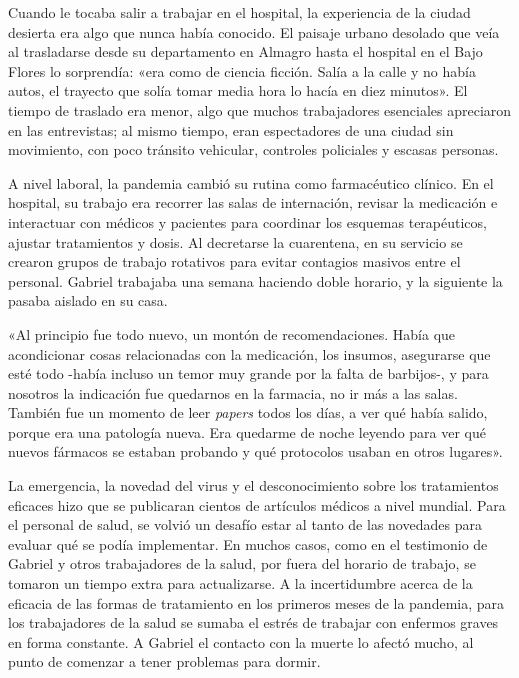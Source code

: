 \begin{refsection}
Cuando le tocaba salir a trabajar en el hospital, la experiencia de la ciudad desierta era algo que nunca había conocido. El paisaje urbano desolado que veía al trasladarse desde su departamento en Almagro hasta el hospital en el Bajo Flores lo sorprendía: «era como de ciencia ficción. Salía a la calle y no había autos, el trayecto que solía tomar media hora lo hacía en diez minutos». El tiempo de traslado era menor, algo que muchos trabajadores esenciales apreciaron en las entrevistas; al mismo tiempo, eran espectadores de una ciudad sin movimiento, con poco tránsito vehicular, controles policiales y escasas personas.

A nivel laboral, la pandemia cambió su rutina como farmacéutico clínico. En el hospital, su trabajo era recorrer las salas de internación, revisar la medicación e interactuar con médicos y pacientes para coordinar los esquemas terapéuticos, ajustar tratamientos y dosis. Al decretarse la cuarentena, en su servicio se crearon grupos de trabajo rotativos para evitar contagios masivos entre el personal. Gabriel trabajaba una semana haciendo doble horario, y la siguiente la pasaba aislado en su casa.


\begin{gbcita}
«Al principio fue todo nuevo, un montón de recomendaciones. Había que acondicionar cosas relacionadas con la medicación, los insumos, asegurarse que esté todo -había incluso un temor muy grande por la falta de barbijos-, y para nosotros la indicación fue quedarnos en la farmacia, no ir más a las salas. También fue un momento de leer \emph{papers} todos los días, a ver qué había salido, porque era una patología nueva. Era quedarme de noche leyendo para ver qué nuevos fármacos se estaban probando y qué protocolos usaban en otros lugares».

\end{gbcita}

La emergencia, la novedad del virus y el desconocimiento sobre los tratamientos eficaces hizo que se publicaran cientos de artículos médicos a nivel mundial. Para el personal de salud, se volvió un desafío estar al tanto de las novedades para evaluar qué se podía implementar. En muchos casos, como en el testimonio de Gabriel y otros trabajadores de la salud, por fuera del horario de trabajo, se tomaron un tiempo extra para actualizarse. A la incertidumbre acerca de la eficacia de las formas de tratamiento en los primeros meses de la pandemia, para los trabajadores de la salud se sumaba el estrés de trabajar con enfermos graves en forma constante. A Gabriel el contacto con la muerte lo afectó mucho, al punto de comenzar a tener problemas para dormir.



\end{refsection}
